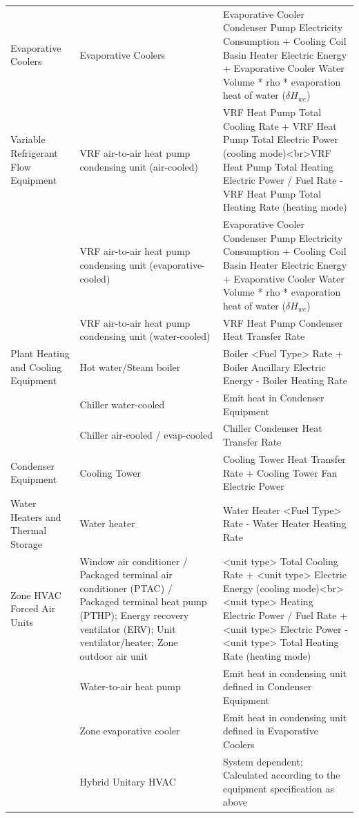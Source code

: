 \begin{longtable}[c]{p{1.0in}p{2.0in}p{3in}}
Evaporative Coolers                 & Evaporative Coolers & Evaporative Cooler Condenser Pump Electricity Consumption + Cooling Coil Basin Heater Electric Energy + Evaporative Cooler Water Volume * rho * evaporation heat of water (\(\delta H_{we}\)) \tabularnewline
Variable Refrigerant Flow Equipment & VRF air-to-air heat pump condensing unit (air-cooled) & VRF Heat Pump Total Cooling Rate + VRF Heat Pump Total Electric Power (cooling mode)<br>VRF Heat Pump Total Heating Electric Power / Fuel Rate - VRF Heat Pump Total Heating Rate (heating mode) \tabularnewline
                                    & VRF air-to-air heat pump condensing unit (evaporative-cooled) & Evaporative Cooler Condenser Pump Electricity Consumption + Cooling Coil Basin Heater Electric Energy + Evaporative Cooler Water Volume * rho * evaporation heat of water (\(\delta H_{we}\)) \tabularnewline
                                    & VRF air-to-air heat pump condensing unit (water-cooled) & VRF Heat Pump Condenser Heat Transfer Rate \tabularnewline
Plant Heating and Cooling Equipment & Hot water/Steam boiler & Boiler <Fuel Type> Rate + Boiler Ancillary Electric Energy - Boiler Heating Rate \tabularnewline
                                    & Chiller water-cooled & Emit heat in Condenser Equipment \tabularnewline
                                    & Chiller air-cooled / evap-cooled & Chiller Condenser Heat Transfer Rate \tabularnewline
Condenser Equipment                 & Cooling Tower & Cooling Tower Heat Transfer Rate + Cooling Tower Fan Electric Power \tabularnewline
Water Heaters and Thermal Storage   & Water heater & Water Heater <Fuel Type> Rate - Water Heater Heating Rate \tabularnewline
Zone HVAC Forced Air Units          & Window air conditioner / Packaged terminal air conditioner (PTAC) / Packaged terminal heat pump (PTHP); Energy recovery ventilator (ERV); Unit ventilator/heater; Zone outdoor air unit & <unit type> Total Cooling Rate + <unit type> Electric Energy (cooling mode)<br><unit type> Heating Electric Power / Fuel Rate + <unit type> Electric Power - <unit type> Total Heating Rate (heating mode) \tabularnewline
                                    & Water-to-air heat pump & Emit heat in condensing unit defined in Condenser Equipment \tabularnewline
                                    & Zone evaporative cooler & Emit heat in condensing unit defined in Evaporative Coolers \tabularnewline
                                    & Hybrid Unitary HVAC & System dependent; Calculated according to the equipment specification as above \tabularnewline
\bottomrule
\end{longtable}

